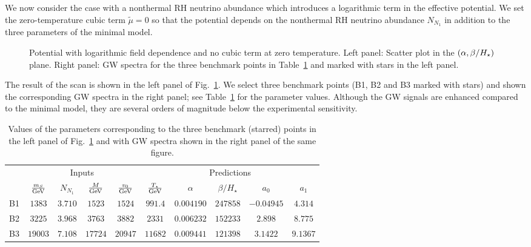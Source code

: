 \documentclass[a4paper,11pt]{article}
\begin{document}
We now consider the case with a nonthermal RH neutrino abundance which introduces 
a logarithmic term in the effective potential. We set
the zero-temperature cubic term $\widetilde{\mu} = 0$ so that the potential depends on the nonthermal RH neutrino abundance $N_{N_1}$
in addition to the three parameters of the minimal model. 
\begin{figure}[t]
\begin{center}
\hspace{2mm}
\end{center}
\caption{Potential with logarithmic field dependence and no cubic term at zero temperature. 
Left panel: Scatter plot in the $(\alpha, \beta/H_\star)$ plane. Right panel: GW spectra for the three benchmark points in Table~\ref{tab:samples_highT} and marked with stars in the left panel.}
\label{f3}
\end{figure}
The result of the scan is shown in the left panel of Fig.~\ref{f3}. We select three 
benchmark points (B1, B2 and B3 marked with stars) and shown the corresponding GW spectra in the right panel; see Table~\ref{tab:samples_highT} for the parameter values. Although the GW signals
are enhanced compared to the minimal model, they are several orders of magnitude below the experimental sensitivity.
\begin{table}[t]
\begin{center}
\begin{tabular}{ l | cccc | ccccc }
 \hline\hline
& \multicolumn{4}{c|}{Inputs} & \multicolumn{5}{c}{Predictions} \\
 \cline{2-10}
 &  $m_S\over {\rm GeV}$ & $N_{N_1}$ & $M\over {\rm GeV}$ & $v_0\over{\rm GeV}$ & $T_\star\over{\rm GeV}$ & $\alpha$ & $\beta / H_\star$ & $a_0$ & $a_1$  \\\hline\hline
 B1& $1383$ & $3.710$ & $1523$ & $1524$ & $991.4$ & $0.004190$ & $247858$ & $-0.04945$ & $4.314$ \\
 B2& $3225$ & $3.968$ & $3763$ & $3882$ & $2331$ & $0.006232$ & $152233$ & $2.898$ & $8.775$ \\
 B3& $19003$ & $7.108$ & $17724$ & $20947$ & $11682$ & $0.009441$ & $121398$ & $3.1422$ & $9.1367$ \\
 \hline\hline
\end{tabular}
\end{center}
\caption{Values of the parameters corresponding to the three benchmark (starred) points in the left panel of Fig.~\ref{f3} and with
GW spectra shown in the right panel of the same figure.}
\label{tab:samples_highT}
\end{table}
\end{document}
